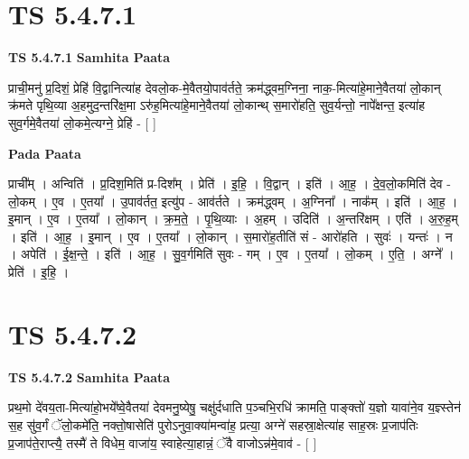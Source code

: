 \documentclass[17pt]{extarticle}
\begin{document}
\section*{ TS 5.4.7.1 }

\textbf{TS 5.4.7.1 } \newline
\textbf{Samhita Paata} \newline

प्राची॒मनु॑ प्र॒दिशं॒ प्रेहि॑ वि॒द्वानित्या॑ह देवलो॒क-मे॒वैतयो॒पाव॑र्तते॒ क्रम॑द्ध्वम॒ग्निना॒ नाक॒-मित्या॑हे॒माने॒वैतया॑ लो॒कान् क्र॑मते पृथि॒व्या अ॒हमुद॒न्तरि॑क्ष॒मा ऽरु॑ह॒मित्या॑हे॒माने॒वैतया॑ लो॒कान्थ् स॒मारो॑हति॒ सुव॒र्यन्तो॒ नापे᳚क्षन्त॒ इत्या॑ह सुव॒र्गमे॒वैतया॑ लो॒कमे॒त्यग्ने॒ प्रेहि॑ - [  ] \newline

\textbf{Pada Paata} \newline

प्राची᳚म् । अन्विति॑ । प्र॒दिश॒मिति॑ प्र-दिश᳚म् । प्रेति॑ । इ॒हि॒ । वि॒द्वान् । इति॑ । आ॒ह॒ । दे॒व॒लो॒कमिति॑ देव - लो॒कम् । ए॒व । ए॒तया᳚ । उ॒पाव॑र्तत॒ इत्यु॑प - आव॑र्तते । क्रम॑द्ध्वम् । अ॒ग्निना᳚ । नाक᳚म् । इति॑ । आ॒ह॒ । इ॒मान् । ए॒व । ए॒तया᳚ । लो॒कान् । क्र॒म॒ते॒ । पृ॒थि॒व्याः । अ॒हम् । उदिति॑ । अ॒न्तरि॑क्षम् । एति॑ । अ॒रु॒ह॒म् । इति॑ । आ॒ह॒ । इ॒मान् । ए॒व । ए॒तया᳚ । लो॒कान् । स॒मारो॑ह॒तीति॑ सं - आरो॑हति । सुवः॑ । यन्तः॑ । न । अपेति॑ । ई॒क्ष॒न्ते॒ । इति॑ । आ॒ह॒ । सु॒व॒र्गमिति॑ सुवः - गम् । ए॒व । ए॒तया᳚ । लो॒कम् । ए॒ति॒ । अग्ने᳚ । प्रेति॑ । इ॒हि॒ ।  \newline




\section*{ TS 5.4.7.2 }

\textbf{TS 5.4.7.2 } \newline
\textbf{Samhita Paata} \newline

प्रथ॒मो दे॑वय॒ता-मित्या॑हो॒भये᳚ष्वे॒वैतया॑ देवमनु॒ष्येषु॒ चक्षु॑र्दधाति प॒ञ्चभि॒रधि॑ क्रामति॒ पाङ्क्तो॑ य॒ज्ञो यावा॑ने॒व य॒ज्ञ्स्तेन॑ स॒ह सु॑व॒र्गं ॅलो॒कमे॑ति॒ नक्तो॒षासेति॑ पुरोऽनुवा॒क्या॑मन्वा॑ह॒ प्रत्या॒ अग्ने॑ सहस्रा॒क्षेत्या॑ह साह॒स्रः प्र॒जाप॑तिः प्र॒जाप॑ते॒राप्त्यै॒ तस्मै॑ ते विधेम॒ वाजा॑य॒ स्वाहेत्या॒हान्नं॒ ॅवै वाजोऽन्न॑मे॒वाव॑ - [  ] \newline
\end{document}
